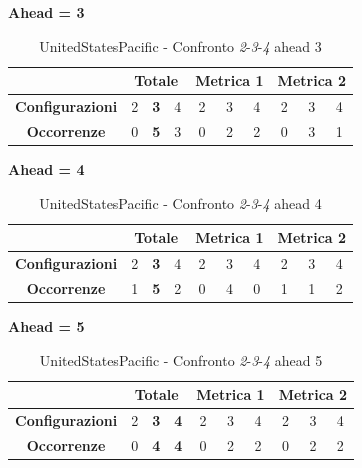 \documentclass[12pt,a4paper,oneside,openright]{book}
\begin{document}
\medskip
\textbf{Ahead = 3}

\begin{table}[H]
\centering
\begin{tabular}{|c|c|c|c|c|c|c|c|c|c|}
\hline
 & \multicolumn{3}{|c|}{\textbf{Totale}} & \multicolumn{3}{|c|}{\textbf{Metrica 1}} & \multicolumn{3}{|c|}{\textbf{Metrica 2}} \\
\hline
\textbf{Configurazioni} & 2 & \textbf{3} & 4 & 2 & 3 & 4 & 2 & 3 & 4 \\
\hline
\textbf{Occorrenze} & 0 & \textbf{5} & 3 & 0 & 2 & 2 & 0 & 3 & 1 \\
\hline
\end{tabular}
\caption{UnitedStatesPacific - Confronto \textit{2}-\textit{3}-\textit{4} ahead 3}
\end{table}

\medskip
\textbf{Ahead = 4}

\begin{table}[H]
\centering
\begin{tabular}{|c|c|c|c|c|c|c|c|c|c|}
\hline
 & \multicolumn{3}{|c|}{\textbf{Totale}} & \multicolumn{3}{|c|}{\textbf{Metrica 1}} & \multicolumn{3}{|c|}{\textbf{Metrica 2}} \\
\hline
\textbf{Configurazioni} & 2 & \textbf{3} & 4 & 2 & 3 & 4 & 2 & 3 & 4 \\
\hline
\textbf{Occorrenze} & 1 & \textbf{5} & 2 & 0 & 4 & 0 & 1 & 1 & 2 \\
\hline
\end{tabular}
\caption{UnitedStatesPacific - Confronto \textit{2}-\textit{3}-\textit{4} ahead 4}
\end{table}

\medskip
\textbf{Ahead = 5}

\begin{table}[H]
\centering
\begin{tabular}{|c|c|c|c|c|c|c|c|c|c|}
\hline
 & \multicolumn{3}{|c|}{\textbf{Totale}} & \multicolumn{3}{|c|}{\textbf{Metrica 1}} & \multicolumn{3}{|c|}{\textbf{Metrica 2}} \\
\hline
\textbf{Configurazioni} & 2 & \textbf{3} & \textbf{4} & 2 & 3 & 4 & 2 & 3 & 4 \\
\hline
\textbf{Occorrenze} & 0 & \textbf{4} & \textbf{4} & 0 & 2 & 2 & 0 & 2 & 2 \\
\hline
\end{tabular}
\caption{UnitedStatesPacific - Confronto \textit{2}-\textit{3}-\textit{4} ahead 5}
\end{table}
\end{document}
